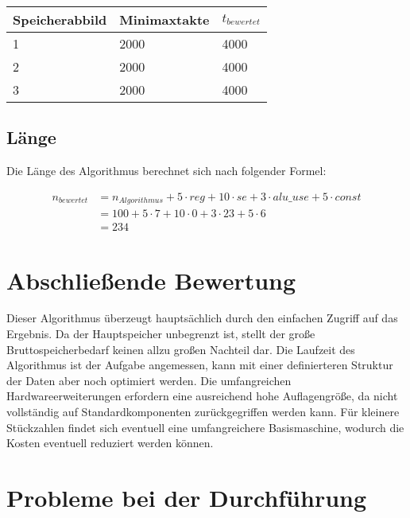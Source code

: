\begin{center}
    \begin{tabular}{|l|l|l|}
        \hline
        Speicherabbild & Minimaxtakte & $t_{bewertet}$ \\
        \hline
        \hline
        1 & 2000 & 4000 \\
        \hline
        2 & 2000 & 4000 \\
        \hline
        3 & 2000 & 4000 \\
        \hline
    \end{tabular}
\end{center}

\subsection{Länge}
\label{subsection:Dokumentation-BenchmarkBewertung-Berechnung-Laenge}

Die Länge des Algorithmus berechnet sich nach folgender Formel:

\begin{align*}
    n_{bewertet} &= n_{Algorithmus} + 5 \cdot reg + 10 \cdot se + 3 \cdot alu\_use + 5 \cdot const \\
                 &= 100 + 5 \cdot 7 + 10 \cdot 0 + 3 \cdot 23 + 5 \cdot 6 \\
                 &= 234
\end{align*}

\section{Abschließende Bewertung}
\label{section:Dokumentation-BenchmarkBewertung-Bewertung}

Dieser Algorithmus überzeugt hauptsächlich durch den einfachen Zugriff auf das Ergebnis. Da der Hauptspeicher unbegrenzt ist, stellt der große Bruttospeicherbedarf keinen allzu großen Nachteil dar. Die Laufzeit des Algorithmus ist der Aufgabe angemessen, kann mit einer definierteren Struktur der Daten aber noch optimiert werden. Die umfangreichen Hardwareerweiterungen erfordern eine ausreichend hohe Auflagengröße, da nicht vollständig auf Standardkomponenten zurückgegriffen werden kann. Für kleinere Stückzahlen findet sich eventuell eine umfangreichere Basismaschine, wodurch die Kosten eventuell reduziert werden können.

\section{Probleme bei der Durchführung}
\label{section:Dokumentation-BenchmarkBewertung-Probleme}


